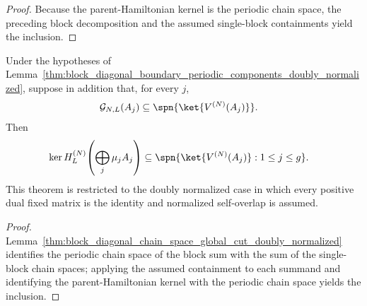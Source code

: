 \begin{proof}
    \leanok
    Because the parent-Hamiltonian kernel is the periodic chain space, the
    preceding block decomposition and the assumed single-block
    containments yield the inclusion.
\end{proof}

\begin{lemma}
    \label{thm:block_diagonal_kernel_global_cut_doubly_normalized}
    \leanok
    Under the hypotheses of
    Lemma~\ref{thm:block_diagonal_boundary_periodic_components_doubly_normalized},
    suppose in addition that, for every $j$,
    \begin{align}
        \mathcal G_{N,L}(A_j)
         & \subseteq\spn\{\ket{V^{(N)}(A_j)}\}.
        \notag
    \end{align}
    Then
    \begin{align}
        \ker H_L^{(N)}\!\left(\bigoplus_j\mu_jA_j\right)
         & \subseteq
        \spn\{\ket{V^{(N)}(A_j)}:1\le j\le g\}.
        \notag
    \end{align}
    This theorem is restricted to the doubly normalized case in which every
    positive dual fixed matrix is the identity and normalized self-overlap is
    assumed.
\end{lemma}

\begin{proof}\leanok
    Lemma~\ref{thm:block_diagonal_chain_space_global_cut_doubly_normalized}
    identifies the periodic chain space of the block sum with the sum of the
    single-block chain spaces; applying the assumed
    containment to each summand and identifying the
    parent-Hamiltonian kernel with the periodic chain space yields the
    inclusion.
\end{proof}

